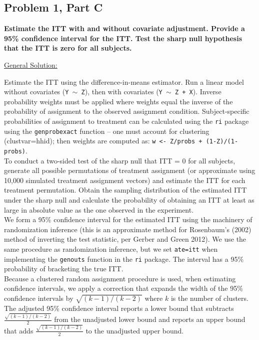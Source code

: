 \documentclass[11pt,notitlepage]{article}
\begin{document}
\clearpage


\subsection{Problem 1, Part C} {\bf Estimate the ITT with and without covariate adjustment. Provide a 95\% confidence interval for the ITT.  Test the sharp null hypothesis that the ITT is zero for all subjects.}

\vspace{1cm}

\underline{{\sc General Solution:}}

Estimate the ITT using the difference-in-means estimator. Run a linear model without covariates ({\tt Y $\sim$ Z}), then with covariates ({\tt Y $\sim$ Z + X}). Inverse probability weights must be applied where weights equal the inverse of the probability of assignment to the observed assignment condition. Subject-specific probabilities of assignment to treatment can be calculated using the {\tt ri} package using the {\tt genprobexact} function -- one must account for clustering (clustvar=hhid); then weights are computed as: {\tt w <- Z/probs + (1-Z)/(1-probs)}.\\

To conduct a two-sided test of the sharp null that ITT = 0 for all subjects, generate all possible permutations of treatment assignment (or approximate using 10,000 simulated treatment assignment vectors) and estimate the ITT for each treatment permutation. Obtain the sampling distribution of the estimated ITT under the sharp null and calculate the probability of obtaining an ITT at least as large in absolute value as the one observed in the experiment. \\

We form a 95\% confidence interval for the estimated ITT using the machinery of randomization inference (this is an approximate method for Rosenbaum's (2002) method of inverting the test statistic, per Gerber and Green 2012). We use the same procedure as randomization inference, but we set {\tt ate=itt} when implementing the {\tt genouts} function in the {\tt ri} package. The interval has a 95\% probability of bracketing the true ITT.\\

Because a clustered random assignment procedure is used, when estimating confidence intervals, we apply a correction that expands the width of the 95\% confidence intervals by $\sqrt{(k-1)/(k-2)}$ where $k$ is the number of clusters. The adjusted 95\% confidence interval reports a lower bound that subtracts  $\frac{\sqrt{(k-1)/(k-2)}}{2}$ from the unadjusted lower bound and reports an upper bound that adds $\frac{\sqrt{(k-1)/(k-2)}}{2}$ to the unadjusted upper bound.\\
\end{document}
